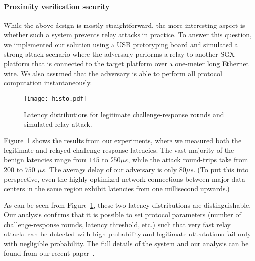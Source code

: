 \paragraph{Proximity verification security} While the above design is mostly straightforward, the more interesting aspect is whether such a system prevents relay attacks in practice. To answer this question, we implemented our solution using a USB prototyping board and simulated a strong attack scenario where the adversary performs a relay to another SGX platform that is connected to the target platform over a one-meter long Ethernet wire. We also assumed that the adversary is able to perform all protocol computation instantaneously. 

\begin{figure}[t]
  \centering
    \texttt{[image: histo.pdf]} 
    \caption{Latency distributions for legitimate challenge-response rounds and simulated relay attack.}
    \label{graph:histogram}
\end{figure}

Figure~\ref{graph:histogram} shows the results from our experiments, where we measured both the legitimate and relayed challenge-response latencies. The vast majority of the benign latencies range from $145$ to $250 \mu s$, while the attack round-trips take from $200$ to $750$ $\mu s$. The average delay of our adversary is only $80 \mu s$. (To put this into perspective, even the highly-optimized network connections between major data centers in the same region exhibit latencies from one millisecond upwards.) 

As can be seen from Figure~\ref{graph:histogram}, these two latency distributions are distinguishable. Our analysis confirms that it is possible to set protocol parameters (number of challenge-response rounds, latency threshold, etc.) such that very fast relay attacks can be detected with high probability and legitimate attestations fail only with negligible probability. The full details of the \proximitee system and our analysis can be found from our recent paper~\cite{proximitee}.





